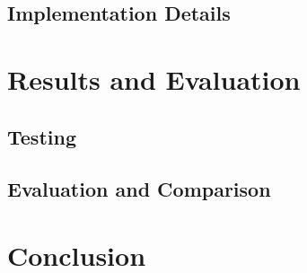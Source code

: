 \documentclass[12pt,a4paper]{article}
\begin{document}
\subsection{Implementation Details}





%
%
%
%
%
%
%
%
\newpage
\section{Results and Evaluation} \label{section:results}


\subsection{Testing}


\subsection{Evaluation and Comparison}





%
%
%
%
%
%
%
%
\newpage
\section{Conclusion} \label{section:conclusion}
\end{document}
